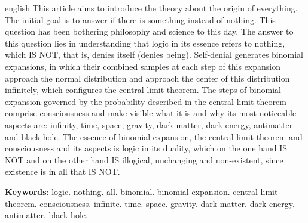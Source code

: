 \renewcommand{\resumoname}{Abstract}
\begin{resumoumacoluna}
 \begin{otherlanguage*}{english}
\vspace{-2mm}
	This article aims to introduce the theory about the origin of everything. The initial goal is to answer if there is something instead of nothing. This question has been bothering philosophy and science to this day. The answer to this question lies in understanding that logic in its essence refers to nothing, which IS NOT, that is, denies itself (denies being). Self-denial generates binomial expansions, in which their combined samples at each step of this expansion approach the normal distribution and approach the center of this distribution infinitely, which configures the central limit theorem. The steps of binomial expansion governed by the probability described in the central limit theorem comprise consciousness and make visible what it is and why its most noticeable aspects are: infinity, time, space, gravity, dark matter, dark energy, antimatter and black hole. The essence of binomial expansion, the central limit theorem and consciousness and its aspects is logic in its duality, which on the one hand IS NOT and on the other hand IS illogical, unchanging and non-existent, since existence is in all that IS NOT.
	\vspace{\onelineskip} 
	\noindent
	
	\textbf{Keywords}: logic. nothing. all. binomial. binomial expansion. central limit theorem. consciousness. infinite. time. space. gravity. dark matter. dark energy. antimatter. black hole.
 \end{otherlanguage*}  
\end{resumoumacoluna}


